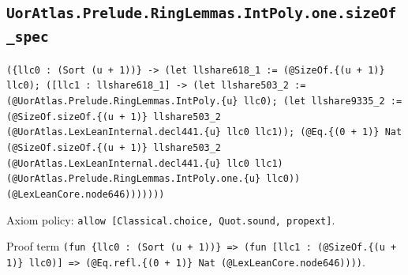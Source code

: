\documentclass[11pt]{article}
\begin{document}
\subsection*{\texttt{UorAtlas.Prelude.RingLemmas.IntPoly.one.sizeOf\_spec}}
\noindent\texttt{(\{llc0 : (Sort (u + 1))\} -> (let llshare618\_1 := (@SizeOf.\{(u + 1)\} llc0); ([llc1 : llshare618\_1] -> (let llshare503\_2 := (@UorAtlas.Prelude.RingLemmas.IntPoly.\{u\} llc0); (let llshare9335\_2 := (@SizeOf.sizeOf.\{(u + 1)\} llshare503\_2 (@UorAtlas.LexLeanInternal.decl441.\{u\} llc0 llc1)); (@Eq.\{(0 + 1)\} Nat (@SizeOf.sizeOf.\{(u + 1)\} llshare503\_2 (@UorAtlas.LexLeanInternal.decl441.\{u\} llc0 llc1) (@UorAtlas.Prelude.RingLemmas.IntPoly.one.\{u\} llc0)) (@LexLeanCore.node646)))))))}\par
\noindent Axiom policy: \texttt{allow [Classical.choice, Quot.sound, propext]}.\par
\noindent Proof term \texttt{(fun \{llc0 : (Sort (u + 1))\} => (fun [llc1 : (@SizeOf.\{(u + 1)\} llc0)] => (@Eq.refl.\{(0 + 1)\} Nat (@LexLeanCore.node646))))}.\par
\end{document}
